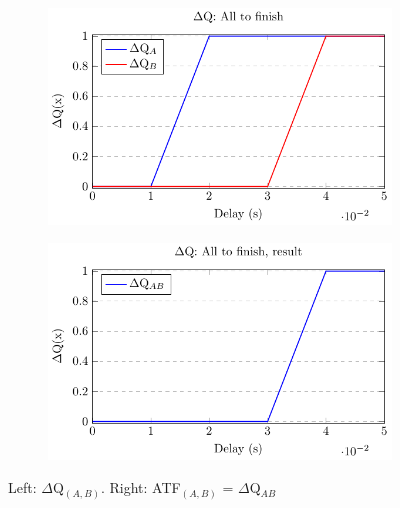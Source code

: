         \begin{figure}[H]
            \centering
            \begin{subfigure}{.5\textwidth}
                \centering
                \includegraphics[scale = 0.7]{tikz/atf_1.pdf}
                \label{fig:atf_1}
            \end{subfigure}%
            \begin{subfigure}{.5\textwidth}
                \centering
                \includegraphics[scale = 0.7]{tikz/atf_2.pdf}
                \label{fig:atf2}
            \end{subfigure}
            \caption{Left: $\Delta$Q$_{(A, B)}$. Right: ATF$_{(A, B)}$ = $\Delta$Q$_{AB}$}%
            \label{fig:atf}
            \end{figure}

